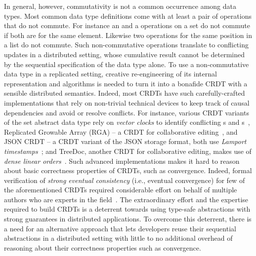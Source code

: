 In general, however, commutativity is not a common occurrence among
data types. Most common data type definitions come with at least a
pair of operations that do not commute. For instance an  and a
 operations on a set do not commute if both are for the same
element.  Likewise two  operations for the same position in
a list do not commute. Such non-commutative operations translate to
conflicting updates in a distributed setting, whose cumulative result
cannot be determined by the sequential specification of the data type
alone. To use a non-commutative data type in a replicated setting,
creative re-engineering of its internal representation and algorithms
is needed to turn it into a bonafide CRDT with a sensible distributed
semantics.
Indeed, most CRDTs have such carefully-crafted implementations that
rely on non-trivial technical devices to keep track of causal
dependencies and avoid or resolve conflicts. For instance, various
CRDT variants of the set abstract data type rely on \emph{vector
clocks} to identify conflicting s and
s~\cite{zawirski-thesis, zhang}, Replicated Growable Array
(RGA) -- a CRDT for collaborative editing~\cite{rga}, and JSON CRDT --
a CRDT variant of the JSON storage format, both use \emph{Lamport
timestamps}~\cite{rga, json-crdt}; and TreeDoc, another CRDT for
collaborative editing, makes use of \emph{dense linear
orders}~\cite{treedoc}. Such advanced implementations makes it hard to
reason about basic correctness properties of CRDTs, such as
convergence. Indeed, formal verification of \emph{strong eventual
consistency} (i.e., eventual convergence) for few of the
aforementioned CRDTs required considerable effort on behalf of
multiple authors who are experts in the field~\cite{kleppmann2017}.
The extraordinary effort and the expertise required to build CRDTs is
a deterrent towards using type-safe abstractions with strong
guarantees in distributed applications. To overcome this deterrent,
there is a need for an alternative approach that lets developers reuse
their sequential abstractions in a distributed setting with little to
no additional overhead of reasoning about their correctness properties
such as convergence.

